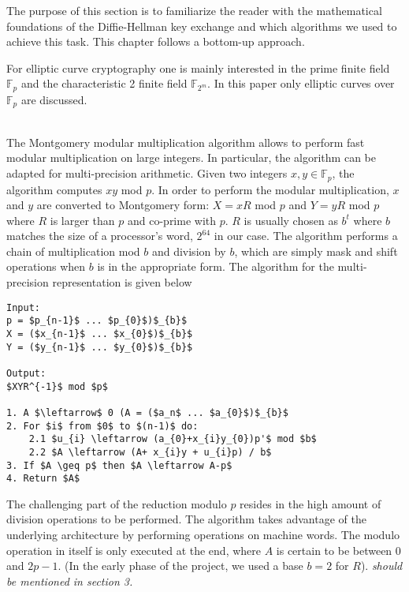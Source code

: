 The purpose of this section is to familiarize the reader with the mathematical foundations of the Diffie-Hellman key exchange and which algorithms we used to achieve this task. This chapter follows a bottom-up approach.

 For elliptic curve cryptography one is mainly interested in the prime finite field $\mathbb{F}_p$ and the characteristic 2 finite field $\mathbb{F}_{2^m}$. In this paper only elliptic curves over $\mathbb{F}_p$ are discussed.

\\The Montgomery modular multiplication algorithm allows to perform fast modular multiplication on large integers. In particular, the algorithm can be adapted for multi-precision arithmetic. Given two integers $x,y \in \mathbb{F}_p$, the algorithm computes $xy$ mod $p$. In order to perform the modular multiplication, $x$ and $y$ are converted to Montgomery form: $X = xR$ mod $p$ and $Y = yR$ mod $p$ where $R$ is larger than $p$ and co-prime with $p$. $R$ is usually chosen as $b^{t}$ where $b$ matches the size of a processor's word, $2^{64}$ in our case. The algorithm performs a chain of multiplication mod $b$ and division by $b$, which are simply mask and shift operations when $b$ is in the appropriate form. The algorithm for the multi-precision representation is given below \cite[p. 602]{Menezes:1996}


\begin{lstlisting}[frame=single, mathescape=true, captionpos=b, caption=Mulitprecision Montogmery Modular Multiplication ]
Input: 
p = $p_{n-1}$ ... $p_{0}$)$_{b}$
X = ($x_{n-1}$ ... $x_{0}$)$_{b}$
Y = ($y_{n-1}$ ... $y_{0}$)$_{b}$

Output:
$XYR^{-1}$ mod $p$

1. A $\leftarrow$ 0 (A = ($a_n$ ... $a_{0}$)$_{b}$
2. For $i$ from $0$ to $(n-1)$ do:
	2.1 $u_{i} \leftarrow (a_{0}+x_{i}y_{0})p'$ mod $b$
	2.2 $A \leftarrow (A+ x_{i}y + u_{i}p) / b$
3. If $A \geq p$ then $A \leftarrow A-p$
4. Return $A$
\end{lstlisting}

The challenging part of the reduction modulo $p$ resides in the high amount of division operations to be performed. The algorithm takes advantage of the underlying architecture by performing operations on machine words. The modulo operation in itself is only executed at the end, where $A$ is certain to be between $0$ and $2p-1$. (In the early phase of the project, we used a base $b=2$ for $R$). \emph{should be mentioned in section 3.}

